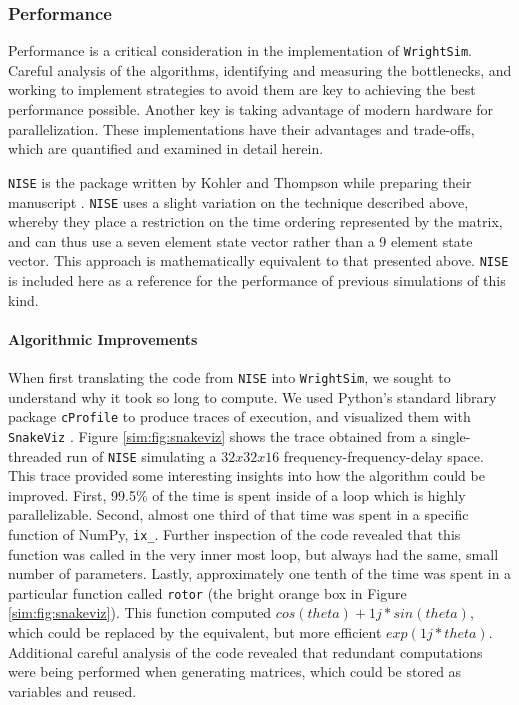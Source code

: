 \hypertarget{performance}{%
\subsubsection{Performance}\label{performance}}

Performance is a critical consideration in the implementation of
\texttt{WrightSim}. Careful analysis of the algorithms, identifying and
measuring the bottlenecks, and working to implement strategies to avoid
them are key to achieving the best performance possible. Another key is
taking advantage of modern hardware for parallelization. These
implementations have their advantages and trade-offs, which are
quantified and examined in detail herein.

\texttt{NISE} \cite{nise} is the package written by Kohler and
Thompson while preparing their manuscript \cite{KohlerDanielDavid2017a}.
\texttt{NISE} uses a slight variation on the technique described above,
whereby they place a restriction on the time ordering represented by the
matrix, and can thus use a seven element state vector rather than a 9
element state vector. This approach is mathematically equivalent to that
presented above. \texttt{NISE} is included here as a reference for the
performance of previous simulations of this kind.

\hypertarget{algorithmic-improvements}{%
\paragraph{Algorithmic
Improvements}\label{algorithmic-improvements}}

When first translating the code from \texttt{NISE} into
\texttt{WrightSim}, we sought to understand why it took so long to
compute. We used Python's standard library package \texttt{cProfile} to
produce traces of execution, and visualized them with \texttt{SnakeViz}
\cite{snakeviz}. Figure \ref{sim:fig:snakeviz} shows the trace obtained
from a single-threaded run of \texttt{NISE} simulating a
\(32 x 32 x 16\) frequency-frequency-delay space. This trace provided
some interesting insights into how the algorithm could be improved.
First, 99.5\% of the time is spent inside of a loop which is highly
parallelizable. Second, almost one third of that time was spent in a
specific function of NumPy, \texttt{ix\_}. Further inspection of the
code revealed that this function was called in the very inner most loop,
but always had the same, small number of parameters. Lastly,
approximately one tenth of the time was spent in a particular function
called \texttt{rotor} (the bright orange box in Figure
\ref{sim:fig:snakeviz}). This function computed
\(cos(theta) + 1j * sin(theta)\), which could be replaced by the
equivalent, but more efficient \(exp(1j * theta)\). Additional careful
analysis of the code revealed that redundant computations were being
performed when generating matrices, which could be stored as variables
and reused.

